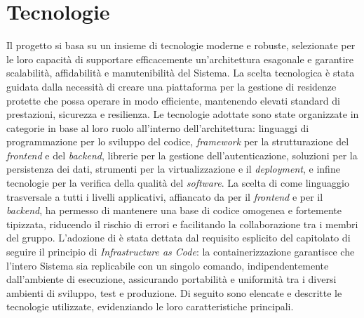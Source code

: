 \section{Tecnologie}
Il progetto si basa su un insieme di tecnologie moderne e robuste, selezionate per le loro 
capacità di supportare efficacemente un'architettura esagonale e garantire scalabilità, 
affidabilità e manutenibilità del Sistema. La scelta tecnologica è stata guidata dalla necessità 
di creare una piattaforma per la gestione di residenze protette che possa operare in modo 
efficiente, mantenendo elevati standard di prestazioni, sicurezza e resilienza. Le tecnologie 
adottate sono state organizzate in categorie in base al loro ruolo all'interno dell'architettura: 
linguaggi di programmazione per lo sviluppo del codice, \textit{framework} per la strutturazione 
del \textit{frontend} e del \textit{backend}, librerie per la gestione dell'autenticazione, soluzioni per la 
persistenza dei dati, strumenti per la virtualizzazione e il \textit{deployment}, e infine tecnologie per 
la verifica della qualità del \textit{software}. La scelta di  come linguaggio 
trasversale a tutti i livelli applicativi, affiancato da  per il \textit{frontend} e 
 per il \textit{backend}, ha permesso di mantenere una base di codice omogenea 
e fortemente tipizzata, riducendo il rischio di errori e facilitando la collaborazione tra i 
membri del gruppo. L'adozione di  è stata dettata dal requisito esplicito del 
capitolato di seguire il principio di \textit{Infrastructure as Code}: la containerizzazione 
garantisce che l'intero Sistema sia replicabile con un singolo comando, indipendentemente 
dall'ambiente di esecuzione, assicurando portabilità e uniformità tra i diversi ambienti di 
sviluppo, test e produzione. Di seguito sono elencate e descritte le tecnologie utilizzate, 
evidenziando le loro caratteristiche principali.


